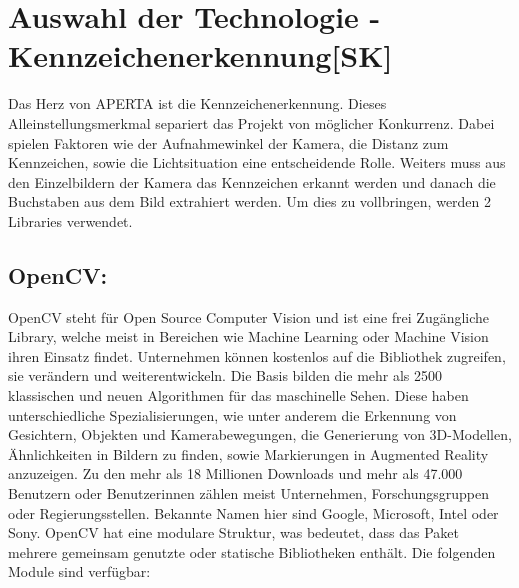 \section{Auswahl der Technologie - Kennzeichenerkennung[SK]}
Das Herz von APERTA ist die Kennzeichenerkennung. Dieses Alleinstellungsmerkmal separiert das Projekt von möglicher Konkurrenz. Dabei spielen Faktoren wie der Aufnahmewinkel der Kamera, die Distanz zum Kennzeichen, sowie die Lichtsituation eine entscheidende Rolle. Weiters muss aus den Einzelbildern der Kamera das Kennzeichen erkannt werden und danach die Buchstaben aus dem Bild extrahiert werden. Um dies zu vollbringen, werden 2 Libraries verwendet.
\subsection{OpenCV: } OpenCV steht für Open Source Computer Vision und ist eine frei Zugängliche Library, welche meist in Bereichen wie Machine Learning oder Machine Vision ihren Einsatz findet. Unternehmen können kostenlos auf die Bibliothek zugreifen, sie verändern und weiterentwickeln. Die Basis bilden die mehr als 2500 klassischen und neuen Algorithmen für das maschinelle Sehen. Diese haben unterschiedliche Spezialisierungen, wie unter anderem die Erkennung von Gesichtern, Objekten und Kamerabewegungen, die Generierung von 3D-Modellen, Ähnlichkeiten in Bildern zu finden, sowie Markierungen in Augmented Reality anzuzeigen. Zu den mehr als 18 Millionen Downloads und mehr als 47.000 Benutzern oder Benutzerinnen zählen meist Unternehmen, Forschungsgruppen oder Regierungsstellen. Bekannte Namen hier sind Google, Microsoft, Intel oder Sony.\cite{AboutOpenCV}
OpenCV hat eine modulare Struktur, was bedeutet, dass das Paket mehrere gemeinsam genutzte oder statische Bibliotheken enthält. Die folgenden Module sind verfügbar:
